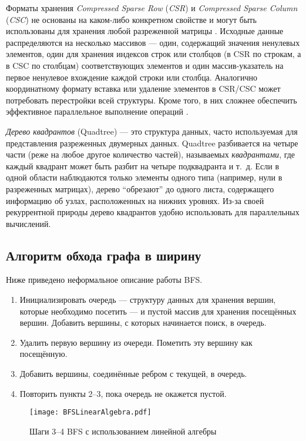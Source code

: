 Форматы хранения \textit{Compressed Sparse Row} (\textit{CSR}) и \textit{Compressed Spar\-se Column} (\textit{CSC}) не основаны на каком-либо конкретном свойстве
и могут быть использованы для хранения любой разреженной матрицы \cite{stanimirovic2009performance}. Исходные данные распределяются на несколько массивов --- один, содержащий значения ненулевых элементов, один для хранения индексов строк или столбцов (в CSR по строкам, а в CSC по столбцам) соответствующих элементов и один массив-указатель на первое ненулевое вхождение каждой строки или столбца. Аналогично координатному формату вставка или удаление элементов в CSR/CSC может потребовать перестройки всей структуры. Кроме того, в них сложнее обеспечить эффективное параллельное выполнение операций \cite{bulucc2009parallel}.

\textit{Дерево квадрантов} (Quadtree) --- это структура данных, часто используемая для представления разреженных двумерных данных. Quad\-tree разбивается на четыре части (реже на любое другое количество частей), называемых \textit{квадрантами}, где каждый квадрант может быть разбит на четыре подквадранта и т.~д. Если в одной области наблюдаются только элементы одного типа (например, нули в разреженных матрицах), дерево \enquote{обрезают} до одного листа, содержащего информацию об узлах, расположенных на нижних уровнях. Из-за своей рекуррентной природы дерево квадрантов удобно использовать для параллельных вычислений.

\subsection{Алгоритм обхода графа в ширину}

Ниже приведено неформальное описание работы BFS.

\begin{enumerate}
    \item Инициализировать очередь --- структуру данных для хранения вершин, которые необходимо посетить --- и пустой массив для хранения посещённых вершин. Добавить вершины, с которых начинается поиск, в очередь.
    \item Удалить первую вершину из очереди. Пометить эту вершину как посещённую.
    \item Добавить вершины, соединённые ребром с текущей, в очередь.
    \item Повторить пункты 2--3, пока очередь не окажется пустой.
\end{enumerate}

\begin{figure}
    \centering
    \texttt{[image: BFSLinearAlgebra.pdf]}
    \caption{Шаги 3--4 BFS с использованием линейной алгебры}
    \label{fig:bfs}
\end{figure}

